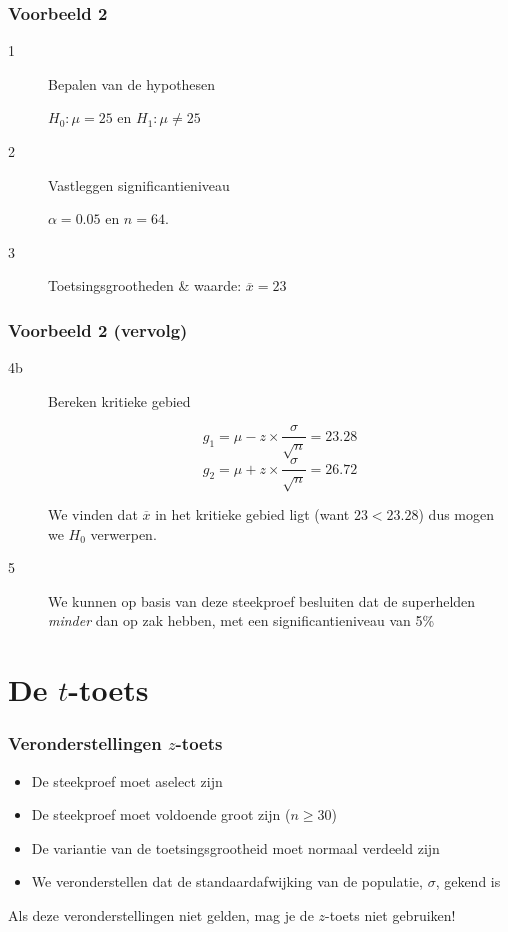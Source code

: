 \documentclass[aspectratio=169]{beamer}
\begin{document}
\begin{frame}
  \frametitle{Voorbeeld 2}
  
  \begin{description}
    \item[1] Bepalen van de hypothesen
    
    $H_{0} : \mu = 25$ en $H_{1}: \mu \neq 25$
    
    \item[2] Vastleggen significantieniveau
    
    $\alpha = 0.05$ en $n=64$.
    
    \item[3] Toetsingsgrootheden \& waarde: $\overline{x} = 23$
  \end{description}
  
\end{frame}

\begin{frame}
  \frametitle{Voorbeeld 2 (vervolg)}
  
  \begin{description}
    \item[4b] Bereken kritieke gebied
    
    \[ g_{1} = \mu - z \times \frac{\sigma}{\sqrt{n}} = 23.28 \]
    \[ g_{2} = \mu + z \times \frac{\sigma}{\sqrt{n}} = 26.72 \]
    
    We vinden dat $\overline{x}$ in het kritieke gebied ligt (want $23 < 23.28$) dus mogen we $H_{0}$ verwerpen.
    \item[5] We kunnen op basis van deze steekproef besluiten dat de superhelden \textit{minder} dan  op zak hebben, met een significantieniveau van 5\%
  \end{description}
\end{frame}

\section{De $t$-toets}

\begin{frame}
  \frametitle{Veronderstellingen $z$-toets}
  
  
  \begin{itemize}
    \item De steekproef moet aselect zijn
    \item De steekproef moet voldoende groot zijn ($n \ge 30$)
    \item De variantie van de toetsingsgrootheid moet normaal verdeeld zijn
    \item We veronderstellen dat de standaardafwijking van de populatie, $\sigma$, gekend is
  \end{itemize}
  
  Als deze veronderstellingen niet gelden, mag je de $z$-toets niet gebruiken!
\end{frame}
\end{document}
